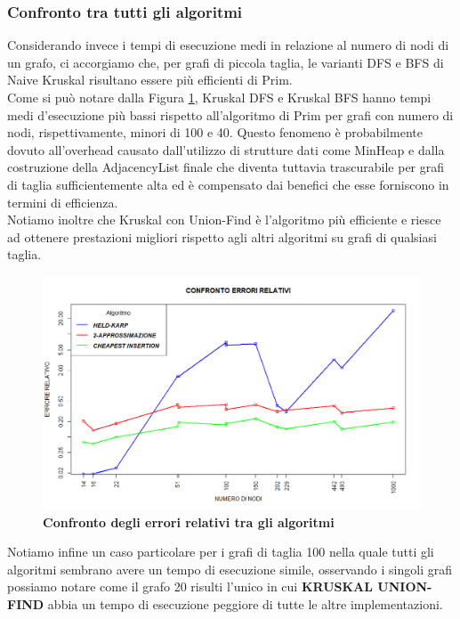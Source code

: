 \documentclass[]{article}
\begin{document}
\begin{flushleft}
\subsubsection{Confronto tra tutti gli algoritmi}
Considerando invece i tempi di esecuzione medi in relazione al numero di nodi di un grafo, ci accorgiamo che, per grafi di piccola taglia, le varianti DFS e BFS di Naive Kruskal risultano essere più efficienti di Prim.\\
Come si può notare dalla Figura \ref{conf_tot}, Kruskal DFS e Kruskal BFS hanno tempi medi d'esecuzione più bassi rispetto all'algoritmo di Prim per grafi con numero di nodi, rispettivamente, minori di 100 e 40.
Questo fenomeno è probabilmente dovuto all'overhead causato dall'utilizzo di strutture dati come MinHeap e dalla costruzione della AdjacencyList finale che diventa tuttavia trascurabile per grafi di taglia sufficientemente alta ed è compensato dai benefici che esse forniscono in termini di efficienza.\\
Notiamo inoltre che Kruskal con Union-Find è l'algoritmo più efficiente e riesce ad ottenere prestazioni migliori rispetto agli altri algoritmi su grafi di qualsiasi taglia.\\
\begin{figure}[h]
	\centering
	\includegraphics[width=\textwidth,height=\textheight,keepaspectratio]{CONFRONTO_ERRORI_RELATIVI_20_MIN_NEW.png}
	\caption{\textbf{Confronto degli errori relativi tra gli algoritmi}}
	\label{conf_tot}
\end{figure}
Notiamo infine un caso particolare per i grafi di taglia 100 nella quale tutti gli algoritmi sembrano avere un tempo di esecuzione simile, osservando i singoli grafi possiamo notare come il grafo 20 risulti l'unico in cui \textbf{KRUSKAL UNION-FIND} abbia un tempo di esecuzione peggiore di tutte le altre implementazioni.
\newpage

\end{flushleft}
\end{document}
